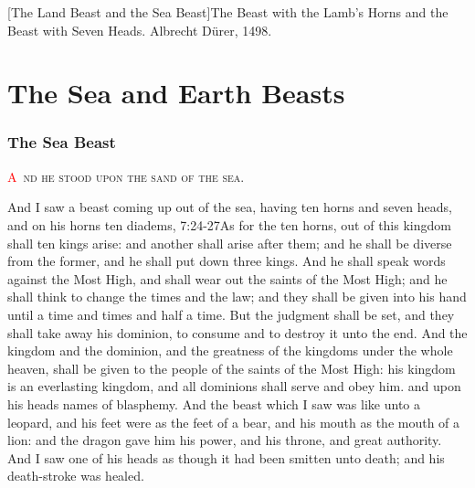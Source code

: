 [The Land Beast and the Sea Beast]{The Beast with the Lamb's Horns and the Beast with Seven Heads. Albrecht Dürer, 1498.}

\chapter{The Sea and Earth Beasts}
\fancyhead{} %
\subsection*{The Sea Beast}
\lettrine[lines=3, slope=0.5em]{\textcolor{red}{A}}{\ nd he stood upon the sand of the sea.}

\zz And I saw a beast coming up out of the sea, having ten horns and seven heads, and on his horns ten diadems,%
					   {7:24-27}{As for the ten horns, out of this kingdom shall ten kings arise: and another shall arise after them; and he shall be diverse from the former, and he shall put down three kings. And he shall speak words against the Most High, and shall wear out the saints of the Most High; and he shall think to change the times and the law; and they shall be given into his hand until a time and times and half a time. But the judgment shall be set, and they shall take away his dominion, to consume and to destroy it unto the end. And the kingdom and the dominion, and the greatness of the kingdoms under the whole heaven, shall be given to the people of the saints of the Most High: his kingdom is an everlasting kingdom, and all dominions shall serve and obey him.} %
and upon his heads names of blasphemy. 
And the beast which I saw was like unto a leopard, and his feet were as the feet of a bear, and his mouth as the mouth of a lion: and the dragon gave him his power, and his throne, and great authority. 
And I saw one of his heads as though it had been smitten unto death; and his death-stroke was healed.

